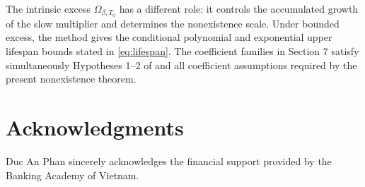 \documentclass[11pt,reqno]{amsart}
\theoremstyle{definition}
\theoremstyle{remark}
\begin{document}
	The intrinsic excess $\Omega_{\beta,T_0}$ has a different role: it controls the accumulated growth of the slow multiplier and determines the nonexistence scale. Under bounded excess, the method gives the conditional polynomial and exponential upper lifespan bounds stated in \eqref{eq:lifespan}. The coefficient families in Section 7 satisfy simultaneously Hypotheses 1--2 of \cite{DGR2019} and all coefficient assumptions required by the present nonexistence theorem.
	
	\section*{Acknowledgments}
	Duc An Phan sincerely acknowledges the financial support provided by the Banking Academy of Vietnam. %
	
	
\end{document}
